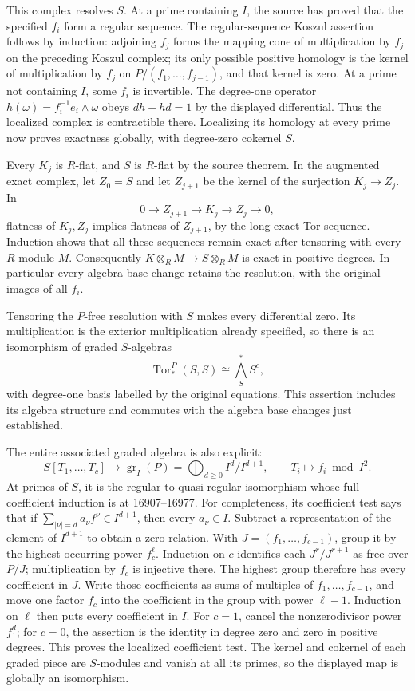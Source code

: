 This complex resolves \(S\). At a prime containing \(I\), the source has proved that the specified \(f_i\) form a regular sequence. The regular-sequence Koszul assertion follows by induction: adjoining \(f_j\) forms the mapping cone of multiplication by \(f_j\) on the preceding Koszul complex; its only possible positive homology is the kernel of multiplication by \(f_j\) on \(P/(f_1,\ldots,f_{j-1})\), and that kernel is zero. At a prime not containing \(I\), some \(f_i\) is invertible. The degree-one operator \(h(\omega)=f_i^{-1} e_i\wedge\omega\) obeys \(dh+hd=1\) by the displayed differential. Thus the localized complex is contractible there. Localizing its homology at every prime now proves exactness globally, with degree-zero cokernel \(S\).

Every \(K_j\) is \(R\)-flat, and \(S\) is \(R\)-flat by the source theorem. In the augmented exact complex, let \(Z_0=S\) and let \(Z_{j+1}\) be the kernel of the surjection \(K_j\to Z_j\). In \[
0\longrightarrow Z_{j+1}\longrightarrow K_j\longrightarrow Z_j\longrightarrow0,
\] flatness of \(K_j,Z_j\) implies flatness of \(Z_{j+1}\), by the long exact Tor sequence. Induction shows that all these sequences remain exact after tensoring with every \(R\)-module \(M\). Consequently \(K\otimes_R M\to S\otimes_R M\) is exact in positive degrees. In particular every algebra base change retains the resolution, with the original images of all \(f_i\).

Tensoring the \(P\)-free resolution with \(S\) makes every differential zero. Its multiplication is the exterior multiplication already specified, so there is an isomorphism of graded \(S\)-algebras \[
\operatorname{Tor}^{P}_*(S,S)\cong\bigwedge^*_S S^c,
\] with degree-one basis labelled by the original equations. This assertion includes its algebra structure and commutes with the algebra base changes just established.

The entire associated graded algebra is also explicit: \[
S[T_1,\ldots,T_c]\longrightarrow\operatorname{gr}_I(P)
=\bigoplus_{d\ge0}I^d/I^{d+1},\qquad T_i\longmapsto f_i\bmod I^2.
\] At primes of \(S\), it is the regular-to-quasi-regular isomorphism whose full coefficient induction is at 16907--16977. For completeness, its coefficient test says that if \(\sum_{|\nu|=d}a_\nu f^\nu\in I^{d+1}\), then every \(a_\nu\in I\). Subtract a representation of the element of \(I^{d+1}\) to obtain a zero relation. With \(J=(f_1,\ldots,f_{c-1})\), group it by the highest occurring power \(f_c^\ell\). Induction on \(c\) identifies each \(J^r/J^{r+1}\) as free over \(P/J\); multiplication by \(f_c\) is injective there. The highest group therefore has every coefficient in \(J\). Write those coefficients as sums of multiples of \(f_1,\ldots,f_{c-1}\), and move one factor \(f_c\) into the coefficient in the group with power \(\ell-1\). Induction on \(\ell\) then puts every coefficient in \(I\). For \(c=1\), cancel the nonzerodivisor power \(f_1^d\); for \(c=0\), the assertion is the identity in degree zero and zero in positive degrees. This proves the localized coefficient test. The kernel and cokernel of each graded piece are \(S\)-modules and vanish at all its primes, so the displayed map is globally an isomorphism.

